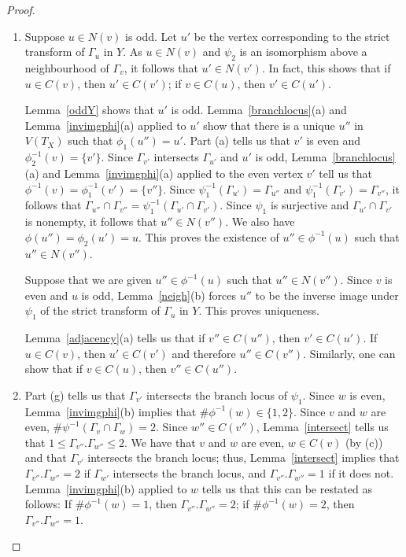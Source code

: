 \begin{proof}
\begin{enumerate}[\upshape (a)]
  \item Suppose $u \in N(v)$ is odd. Let $u'$ be the vertex corresponding to the strict transform of $\Gamma_u$ in $Y$. As $u \in N(v)$ and $\psi_2$ is an isomorphism above a neighbourhood of $\Gamma_{v}$, it follows that $u' \in N(v')$. In fact, this shows that if $u \in C(v)$, then $u' \in C(v')$; if $v \in C(u)$, then $v' \in C(u')$.
  
  Lemma~\ref{oddY} shows that $u'$ is odd. Lemma~\ref{branchlocus}(a) and Lemma~\ref{invimgphi}(a) applied to $u'$ show that there is a unique $u''$ in $V(T_X)$ such that $\phi_1(u'') = u'$. Part (a) tells us that $v'$ is even and $\phi_2^{-1}(v) = \{ v' \}$. Since $\Gamma_{v'}$ intersects $\Gamma_{u'}$ and $u'$ is odd, Lemma~\ref{branchlocus}(a) and Lemma~\ref{invimgphi}(a) applied to the even vertex $v'$ tell us that $\phi^{-1}(v) = \phi_1^{-1}(v') = \{ v'' \}$. Since $\psi_1^{-1}(\Gamma_{u'}) = \Gamma_{u''}$ and $\psi_1^{-1}(\Gamma_{v'}) = \Gamma_{v''}$, it follows that $\Gamma_{u''} \cap \Gamma_{v''} = \psi_1^{-1}(\Gamma_{u'} \cap \Gamma_{v'})$. Since $\psi_1$ is surjective and $\Gamma_{u'} \cap \Gamma_{v'}$ is nonempty, it follows that $u'' \in N(v'')$. We also have $\phi(u'') = \phi_2(u') = u$. This proves the existence of $u'' \in \phi^{-1}(u)$ such that $u'' \in N(v'')$.
  
  Suppose that we are given $u'' \in \phi^{-1}(u)$ such that $u'' \in N(v'')$. Since $v$ is even and $u$ is odd, Lemma~\ref{neigh}(b)  forces $u''$ to be the inverse image under $\psi_1$ of the strict transform of $\Gamma_u$ in $Y$. This proves uniqueness.
  
  Lemma~\ref{adjacency}(a) tells us that if $v'' \in C(u'')$, then $v' \in C(u')$. If $u \in C(v)$, then $u' \in C(v')$ and therefore $u'' \in C(v'')$. Similarly, one can show that if $v \in C(u)$, then $v'' \in C(u'')$.
  
  \item Part (g) tells us that $\Gamma_{v'}$ intersects the branch locus of $\psi_1$. Since $w$ is even, Lemma~\ref{invimgphi}(b) implies that $\# \phi^{-1}(w) \in \{1,2\}$. Since $v$ and $w$ are even,  $\# \psi^{-1}(\Gamma_v \cap \Gamma_{w}) = 2$. Since $w'' \in C(v'')$, Lemma~\ref{intersect} tells us that $1 \leq \Gamma_{v''}.\Gamma_{w''} \leq 2$. We have that $v$ and $w$ are even, $w \in C(v)$ (by (c)) and that $\Gamma_{v'}$ intersects the branch locus; thus, Lemma~\ref{intersect} implies that $\Gamma_{v''}.\Gamma_{w''} = 2$ if $\Gamma_{w'}$ intersects the branch locus, and $\Gamma_{v''}.\Gamma_{w''} = 1$ if it does not. Lemma~\ref{invimgphi}(b) applied to $w$ tells us that this can be restated as follows: If $\# \phi^{-1}(w) = 1$, then  $\Gamma_{v''}.\Gamma_{w''} = 2$; if $\# \phi^{-1}(w) = 2$, then $\Gamma_{v''}.\Gamma_{w''} = 1$.
  

\end{enumerate}
\end{proof}
